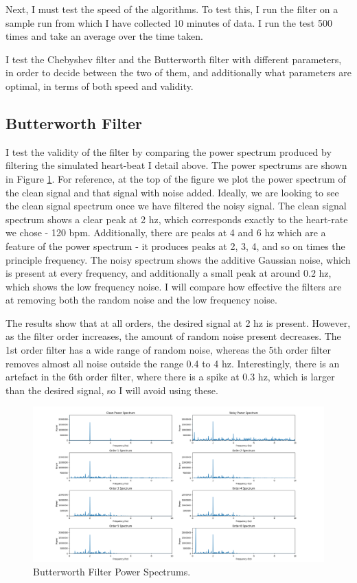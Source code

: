 \documentclass[12pt,a4paper,twoside,openright]{report}
\begin{document}
Next, I must test the speed of the algorithms. To test this, I run the filter
on a sample run from which I have collected 10 minutes of data. I run the test
500 times and take an average over the time taken.

I test the Chebyshev filter and the Butterworth filter with different
parameters, in order to decide between the two of them, and additionally what
parameters are optimal, in terms of both speed and validity.

\subsection{Butterworth Filter}

I test the validity of the filter by comparing the power spectrum produced by
filtering the simulated heart-beat I detail above. The power spectrums are
shown in Figure 
\ref{fig:butterworth-validity}. For reference, at the top of the figure we
plot the power spectrum of the clean signal and that signal with noise added.
Ideally, we are looking to see the clean signal spectrum once we have filtered the
noisy signal. The clean signal spectrum shows a clear peak at 2 hz, which
corresponds exactly to the heart-rate we chose - 120 bpm. Additionally, there
are peaks at 4 and 6 hz which are a feature of the power spectrum - it
produces peaks at 2, 3, 4, and so on times the principle frequency. The noisy
spectrum shows the additive Gaussian noise, which is present at every
frequency, and additionally a small peak at around 0.2 hz, which shows the low
frequency noise. I will compare how effective the filters are at removing both
the random noise and the low frequency noise.

The results show that at all orders, the desired signal at 2 hz is present.
However, as the filter order increases, the amount of random noise present
decreases. The 1st order filter has a wide range of random noise, whereas the
5th order filter removes almost all noise outside the range 0.4 to 4 hz.
Interestingly, there is an artefact in the 6th order filter, where there is a
spike at 0.3 hz, which is larger than the desired signal, so I will avoid
using these. 

\begin{figure}
	\centering
	\includegraphics[width=\textwidth]{figs/butterworth-validity.png}
	\caption{Butterworth Filter Power Spectrums.}
	\label{fig:butterworth-validity}
\end{figure}
\end{document}
